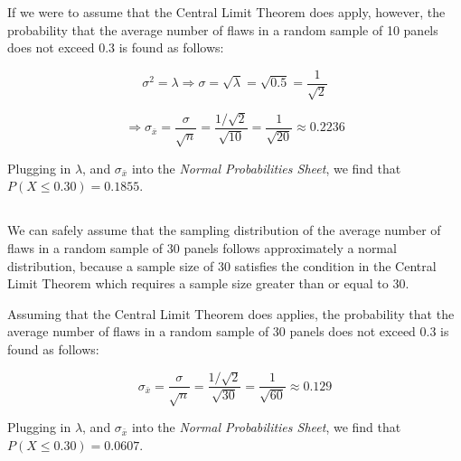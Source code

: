 \documentclass[letterpaper]{article}
\begin{document}
If we were to assume that the Central Limit Theorem does apply, however, the
probability that the average number of flaws in a random sample of 10 panels
does not exceed 0.3 is found as follows:

$$\sigma^2 = \lambda \Rightarrow
 \sigma = \sqrt{\lambda} = \sqrt{0.5} = \frac{1}{\sqrt{2}} $$

$$\Rightarrow \sigma_{\bar{x}} = \frac{\sigma}{\sqrt{n}} =
 \frac{1/\sqrt{2}}{\sqrt{10}} = \frac{1}{\sqrt{20}} \approx 0.2236 $$

Plugging in $\lambda$, and $\sigma_{\bar{x}}$ into the \textit{Normal Probabilities Sheet},
we find that $P(X \leq 0.30) = 0.1855$.

\subsection{}%

\label{3b}
We can safely assume that the sampling distribution of the average number of
flaws in a random sample of 30 panels follows approximately a normal
distribution, because a sample size of 30 satisfies the condition in the Central
Limit Theorem which requires a sample size greater than or equal to 30.

Assuming that the Central Limit Theorem does applies, the
probability that the average number of flaws in a random sample of 30 panels
does not exceed 0.3 is found as follows:

$$\sigma_{\bar{x}} = \frac{\sigma}{\sqrt{n}} =
 \frac{1/\sqrt{2}}{\sqrt{30}} = \frac{1}{\sqrt{60}} \approx 0.129 $$

Plugging in $\lambda$, and $\sigma_{\bar{x}}$ into the \textit{Normal Probabilities Sheet},
we find that $P(X \leq 0.30) = 0.0607$.

\section{}%
\end{document}
